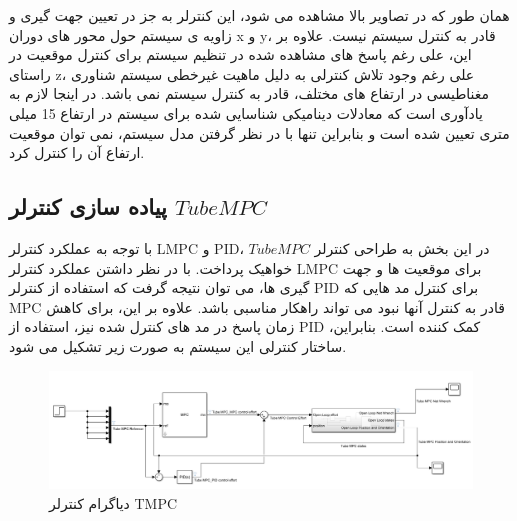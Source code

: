 همان طور که در تصاویر بالا مشاهده می شود، این کنترلر به جز در تعیین جهت گیری و زاویه ی سیستم حول محور های دوران x و y، قادر به کنترل سیستم نیست. علاوه بر این، علی رغم پاسخ های مشاهده شده در تنظیم سیستم برای کنترل موقعیت در راستای z، علی رغم وجود تلاش کنترلی به دلیل ماهیت غیرخطی سیستم شناوری مغناطیسی در ارتفاع های مختلف، قادر به کنترل سیستم نمی باشد. در اینجا لازم به یادآوری است که معادلات دینامیکی شناسایی شده برای سیستم در ارتفاع 15 میلی متری تعیین شده است و بنابراین تنها با در نظر گرفتن مدل سیستم، نمی توان موقعیت ارتفاع آن را کنترل کرد.

\subsection{پیاده سازی کنترلر $Tube MPC$}

با توجه به عملکرد کنترلر LMPC و PID، در این بخش به طراحی کنترلر $Tube MPC$ خواهیک پرداخت. با در نظر داشتن عملکرد کنترلر LMPC برای موقعیت ها و جهت گیری ها، می توان نتیجه گرفت که استفاده از کنترلر PID برای کنترل مد هایی که MPC قادر به کنترل آنها نبود می تواند راهکار مناسبی باشد. علاوه بر این، برای کاهش زمان پاسخ در مد های کنترل شده نیز، استفاده از PID کمک کننده است. 
بنابراین، ساختار کنترلی این سیستم به صورت زیر تشکیل می شود.
\begin{figure}[H]
	\centering
	\includegraphics[width=1\linewidth]{../img/TMPC_Diagram}
	\caption{دیاگرام کنترلر TMPC}
	\label{fig:tmpcdiagram}
\end{figure}

